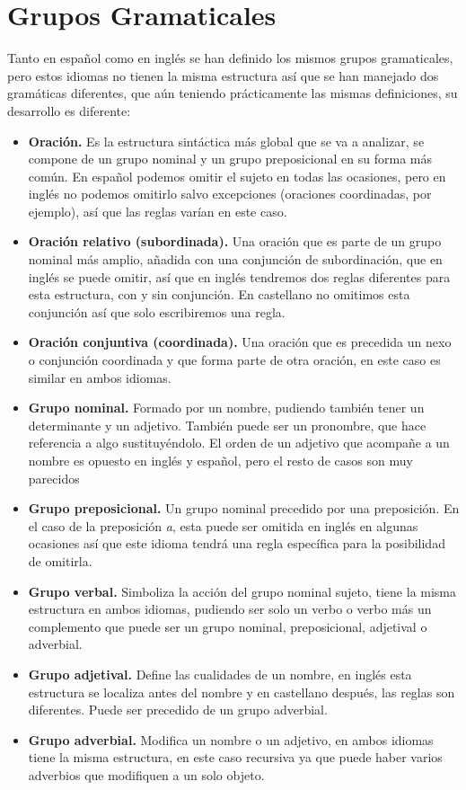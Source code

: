 \documentclass{article}
\begin{document}
\section{Grupos Gramaticales}
Tanto en español como en inglés se han definido los mismos grupos gramaticales, pero estos idiomas no tienen 
la misma estructura así que se han manejado dos gramáticas diferentes, que aún teniendo prácticamente las 
mismas definiciones, su desarrollo es diferente:
\begin{itemize}
    \item \textbf{Oración.} Es la estructura sintáctica más global que se va a analizar, se compone de un grupo nominal y un grupo 
    preposicional en su forma más común. En español podemos omitir el sujeto en todas las ocasiones, pero en inglés no podemos 
    omitirlo salvo excepciones (oraciones coordinadas, por ejemplo), así que las reglas varían en este caso.
    \item \textbf{Oración relativo (subordinada).} Una oración que es parte de un grupo nominal más amplio, añadida con una conjunción 
    de subordinación, que en inglés se puede omitir, así que en inglés tendremos dos reglas diferentes para esta estructura, con y sin 
    conjunción. En castellano no omitimos esta conjunción así que solo escribiremos una regla.
    \item \textbf{Oración conjuntiva (coordinada).} Una oración que es precedida un nexo o conjunción coordinada y que forma parte de 
    otra oración, en este caso es similar en ambos idiomas.
    \item \textbf{Grupo nominal.} Formado por un nombre, pudiendo también tener un determinante y un adjetivo. También puede ser un 
    pronombre, que hace referencia a algo sustituyéndolo. El orden de un adjetivo que acompañe a un nombre es opuesto en inglés y español,
    pero el resto de casos son muy parecidos
    \item \textbf{Grupo preposicional.} Un grupo nominal precedido por una preposición. En el caso de la preposición \textit{a}, esta puede
    ser omitida en inglés en algunas ocasiones así que este idioma tendrá una regla específica para la posibilidad de omitirla.
    \item \textbf{Grupo verbal.} Simboliza la acción del grupo nominal sujeto, tiene la misma estructura en ambos idiomas, pudiendo 
    ser solo un verbo o verbo más un complemento que puede ser un grupo nominal, preposicional, adjetival o adverbial.
    \item \textbf{Grupo adjetival.} Define las cualidades de un nombre, en inglés esta estructura se localiza antes del nombre 
    y en castellano después, las reglas son diferentes. Puede ser precedido de un grupo adverbial.
    \item \textbf{Grupo adverbial.} Modifica un nombre o un adjetivo, en ambos idiomas tiene la misma estructura, en este caso 
    recursiva ya que puede haber varios adverbios que modifiquen a un solo objeto.
\end{itemize}
\end{document}
